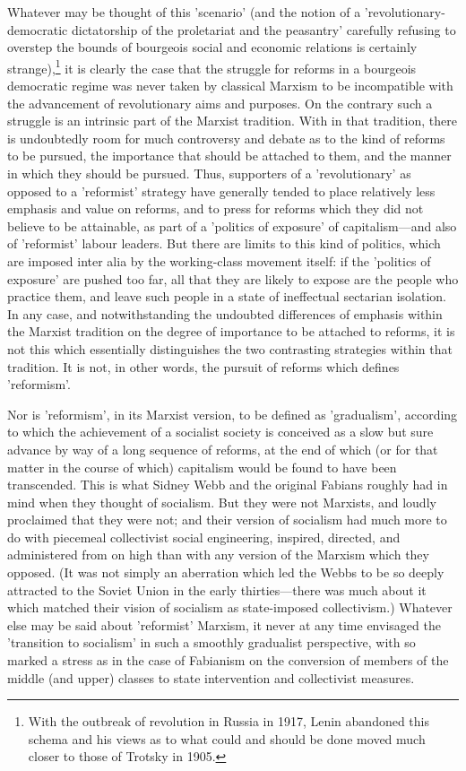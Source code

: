 Whatever may be thought of this 'scenario' (and the notion of a 'revolutionary\hyp{}democratic dictatorship of the proletariat and the peasantry' carefully refusing to overstep the bounds of bourgeois social and economic relations is certainly strange),\footnote{With the outbreak of revolution in Russia in 1917, Lenin abandoned this schema and his views as to what could and should be done moved much closer to those of Trotsky in 1905.} it is clearly the case that the struggle for reforms in a bourgeois democratic regime was never taken by classical Marxism to be incompatible with the advancement of revolutionary aims and purposes. On the contrary such a struggle is an intrinsic part of the Marxist tradition. With in that tradition, there is undoubtedly room for much controversy and debate as to the kind of reforms to be pursued, the importance that should be attached to them, and the manner in which they should be pursued. Thus, supporters of a 'revolutionary' as opposed to a 'reformist' strategy have generally tended to place relatively less emphasis and value on reforms, and to press for reforms which they did not believe to be attainable, as part of a 'politics of exposure' of capitalism—and also of 'reformist' labour leaders. But there are limits to this kind of politics, which are imposed inter alia by the working\hyp{}class movement itself: if the 'politics of exposure' are pushed too far, all that they are likely to expose are the people who practice them, and leave such people in a state of ineffectual sectarian isolation. In any case, and notwithstanding the undoubted differences of emphasis within the Marxist tradition on the degree of importance to be attached to reforms, it is not this which essentially distinguishes the two contrasting strategies within that tradition. It is not, in other words, the pursuit of reforms which defines 'reformism'.

Nor is 'reformism', in its Marxist version, to be defined as 'gradualism', according to which the achievement of a socialist society is conceived as a slow but sure advance by way of a long sequence of reforms, at the end of which (or for that matter in the course of which) capitalism would be found to have been transcended. This is what Sidney Webb and the original Fabians roughly had in mind when they thought of socialism. But they were not Marxists, and loudly proclaimed that they were not; and their version of socialism had much more to do with piecemeal collectivist social engineering, inspired, directed, and administered from on high than with any version of the Marxism which they opposed. (It was not simply an aberration which led the Webbs to be so deeply attracted to the Soviet Union in the early thirties—there was much about it which matched their vision of socialism as state-imposed collectivism.) Whatever else may be said about 'reformist' Marxism, it never at any time envisaged the 'transition to socialism' in such a smoothly gradualist perspective, with so marked a stress as in the case of Fabianism on the conversion of members of the middle (and upper) classes to state intervention and collectivist measures.

